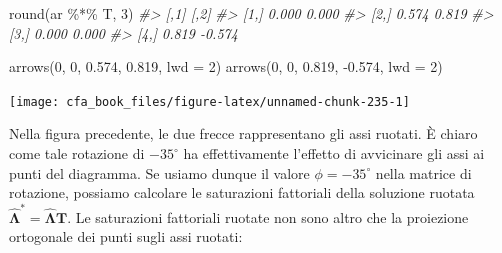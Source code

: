 \documentclass[
  11pt,
]{krantz}
\makeatletter
\newenvironment{Shaded}{\begin{snugshade}}{\end{snugshade}}
\newcommand{\AttributeTok}[1]{\textcolor[rgb]{0.61,0.61,0.61}{#1}}
\newcommand{\CommentTok}[1]{\textcolor[rgb]{0.37,0.37,0.37}{\textit{#1}}}
\newcommand{\ConstantTok}[1]{\textcolor[rgb]{0,0,0}{#1}}
\newcommand{\DecValTok}[1]{\textcolor[rgb]{0.06,0.06,0.06}{#1}}
\newcommand{\FloatTok}[1]{\textcolor[rgb]{0.06,0.06,0.06}{#1}}
\newcommand{\FunctionTok}[1]{\textcolor[rgb]{0,0,0}{#1}}
\newcommand{\NormalTok}[1]{#1}
\newcommand{\OtherTok}[1]{\textcolor[rgb]{0.37,0.37,0.37}{#1}}
\newcommand{\SpecialCharTok}[1]{\textcolor[rgb]{0,0,0}{#1}}
\newenvironment{kframe}{%
\medskip{}
\setlength{\fboxsep}{.8em}
 \def\at@end@of@kframe{}%
 \ifinner\ifhmode%
  \def\at@end@of@kframe{\end{minipage}}%
  \begin{minipage}{\columnwidth}%
 \fi\fi%
 \def\FrameCommand##1{\hskip\@totalleftmargin \hskip-\fboxsep
 \colorbox{shadecolor}{##1}\hskip-\fboxsep
     \hskip-\linewidth \hskip-\@totalleftmargin \hskip\columnwidth}%
 \MakeFramed {\advance\hsize-\width
   \@totalleftmargin\z@ \linewidth\hsize
   \@setminipage}}%
 {\par\unskip\endMakeFramed%
 \at@end@of@kframe}
\renewenvironment{Shaded}{\begin{kframe}}{\end{kframe}}
\theoremstyle{definition}
\theoremstyle{definition}
\theoremstyle{definition}
\theoremstyle{definition}
\theoremstyle{remark}
\makeatother
\begin{document}
\begin{Shaded}
\begin{Highlighting}[]
\FunctionTok{round}\NormalTok{(ar }\SpecialCharTok{\%*\%}\NormalTok{ T, }\DecValTok{3}\NormalTok{)}
\CommentTok{\#\textgreater{}       [,1]   [,2]}
\CommentTok{\#\textgreater{} [1,] 0.000  0.000}
\CommentTok{\#\textgreater{} [2,] 0.574  0.819}
\CommentTok{\#\textgreater{} [3,] 0.000  0.000}
\CommentTok{\#\textgreater{} [4,] 0.819 {-}0.574}

\FunctionTok{arrows}\NormalTok{(}\DecValTok{0}\NormalTok{, }\DecValTok{0}\NormalTok{, }\FloatTok{0.574}\NormalTok{, }\FloatTok{0.819}\NormalTok{, }\AttributeTok{lwd =} \DecValTok{2}\NormalTok{)}
\FunctionTok{arrows}\NormalTok{(}\DecValTok{0}\NormalTok{, }\DecValTok{0}\NormalTok{, }\FloatTok{0.819}\NormalTok{, }\SpecialCharTok{{-}}\FloatTok{0.574}\NormalTok{, }\AttributeTok{lwd =} \DecValTok{2}\NormalTok{)}
\end{Highlighting}
\end{Shaded}

\begin{center}\texttt{[image: cfa\_book\_files/figure-latex/unnamed-chunk-235-1]} \end{center}

Nella figura precedente, le due frecce rappresentano gli assi ruotati. È chiaro come tale rotazione di \(-35^{\circ}\) ha effettivamente l'effetto di avvicinare gli assi ai punti del diagramma. Se usiamo dunque il valore \(\phi = -35^{\circ}\) nella matrice di rotazione, possiamo calcolare le saturazioni fattoriali della soluzione ruotata \(\hat{\boldsymbol{\Lambda}}^* = \hat{\boldsymbol{\Lambda}} \textbf{T}\). Le saturazioni fattoriali ruotate non sono altro che la proiezione ortogonale dei punti sugli assi ruotati:

\begin{Shaded}
\end{Shaded}
\end{document}

